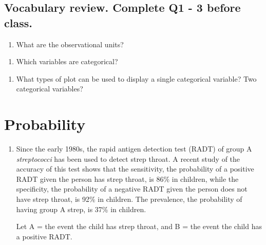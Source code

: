 \documentclass[
]{report}
\providecommand{\tightlist}{%
  \setlength{\itemsep}{0pt}\setlength{\parskip}{0pt}}
\begin{document}
\hypertarget{vocabulary-review.-complete-q1---3-before-class.}{%
\subsection*{Vocabulary review. Complete Q1 - 3 before class.}\label{vocabulary-review.-complete-q1---3-before-class.}}

\begin{enumerate}
\def\labelenumi{\arabic{enumi}.}
\tightlist
\item
  What are the observational units?
\end{enumerate}

\vspace{0.5in}

\begin{enumerate}
\def\labelenumi{\arabic{enumi}.}
\setcounter{enumi}{1}
\tightlist
\item
  Which variables are categorical?
\end{enumerate}

\vspace{1in}

\begin{enumerate}
\def\labelenumi{\arabic{enumi}.}
\setcounter{enumi}{2}
\tightlist
\item
  What types of plot can be used to display a single categorical variable? Two categorical variables?
\end{enumerate}

\newpage

\hypertarget{probability}{%
\section{Probability}\label{probability}}

\begin{enumerate}
\def\labelenumi{\arabic{enumi}.}
\setcounter{enumi}{3}
\item
  Since the early 1980s, the rapid antigen detection test (RADT) of group A \emph{streptococci} has been used to detect strep throat. A recent study of the accuracy of this test shows that the sensitivity, the probability of a positive RADT given the person has strep throat, is 86\% in children, while the specificity, the probability of a negative RADT given the person does not have strep throat, is 92\% in children. The prevalence, the probability of having group A strep, is 37\% in children.
  \vspace{1mm}

  Let A = the event the child has strep throat, and B = the event the child has a positive RADT.
  \vspace{0.1in}
\end{enumerate}
\end{document}
